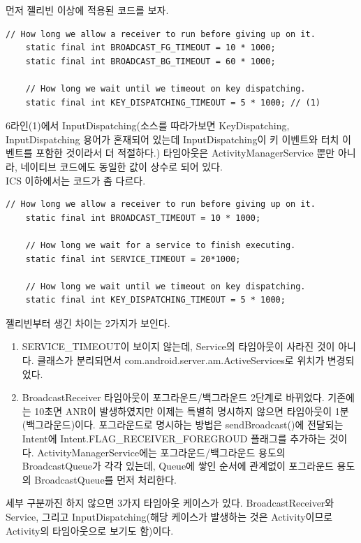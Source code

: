 먼저 젤리빈 이상에 적용된 코드를 보자.
\begin{lstlisting}[frame=single] 
	// How long we allow a receiver to run before giving up on it.
	static final int BROADCAST_FG_TIMEOUT = 10 * 1000;
	static final int BROADCAST_BG_TIMEOUT = 60 * 1000;

	// How long we wait until we timeout on key dispatching.
	static final int KEY_DISPATCHING_TIMEOUT = 5 * 1000; // (1)
\end{lstlisting}
6라인(1)에서 InputDispatching(소스를 따라가보면 KeyDispatching, InputDispatching 용어가 혼재되어 있는데 InputDispatching이 키 이벤트와 터치 이벤트를 포함한 것이라서 더 적절하다.) 타임아웃은 ActivityManagerService 뿐만 아니라, 네이티브 코드에도 동일한 값이 상수로 되어 있다.\\

ICS 이하에서는 코드가 좀 다르다.
\begin{lstlisting}[frame=single] 
	// How long we allow a receiver to run before giving up on it.
	static final int BROADCAST_TIMEOUT = 10 * 1000;

	// How long we wait for a service to finish executing.
	static final int SERVICE_TIMEOUT = 20*1000;

	// How long we wait until we timeout on key dispatching.
	static final int KEY_DISPATCHING_TIMEOUT = 5 * 1000;
\end{lstlisting}

젤리빈부터 생긴 차이는 2가지가 보인다.
\begin{enumerate}
\item  SERVICE\_TIMEOUT이 보이지 않는데, Service의 타임아웃이 사라진 것이 아니다. 
클래스가 분리되면서 com.android.server.am.ActiveServices로 위치가 변경되었다.

\item BroadcastReceiver 타임아웃이 포그라운드/백그라운드 2단계로 바뀌었다. 
기존에는 10초면 ANR이 발생하였지만 이제는 특별히 명시하지 않으면 타임아웃이 1분(백그라운드)이다. 포그라운드로 명시하는 방법은 sendBroadcast()에 전달되는 Intent에 Intent.FLAG\_RECEIVER\-\_FOREGROUD 플래그를 추가하는 것이다.
ActivityManagerService에는 포그라운드/백그라운드 용도의 BroadcastQueue가 각각 있는데, Queue에 쌓인 순서에 관계없이 포그라운드 용도의 BroadcastQueue를 먼저 처리한다.
\end{enumerate}

세부 구분까진 하지 않으면 3가지 타임아웃 케이스가 있다. 
BroadcastReceiver와 Service, 그리고 InputDispatching(해당 케이스가 발생하는 것은 Activity이므로 Activity의 타임아웃으로 보기도 함)이다.\\

